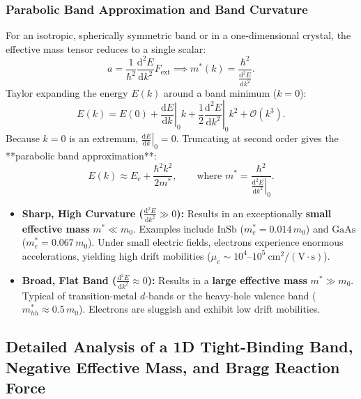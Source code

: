 \documentclass[11pt,a4paper]{article}
\newcommand{\dv}[2]{\frac{\mathrm{d}#1}{\mathrm{d}#2}}
\newcommand{\dvtwo}[2]{\frac{\mathrm{d}^2#1}{\mathrm{d}#2^2}}
\newcommand{\hb}{\hbar}
\newcommand{\hbarsq}{\hb^2}
\begin{document}
\subsubsection{Parabolic Band Approximation and Band Curvature}
For an isotropic, spherically symmetric band or in a one-dimensional crystal, the effective mass tensor reduces to a single scalar:
\begin{equation}
    a = \frac{1}{\hbarsq}\dvtwo{E}{k} F_{\mathrm{ext}} \implies \boxed{m^*(k) = \frac{\hbarsq}{\dvtwo{E}{k}}.}
    \label{eq:mstar_scalar_master}
\end{equation}
Taylor expanding the energy $E(k)$ around a band minimum ($k=0$):
\begin{equation}
    E(k) = E(0) + \left.\dv{E}{k}\right|_0 k + \frac{1}{2}\left.\dvtwo{E}{k}\right|_0 k^2 + \mathcal{O}(k^3).
\end{equation}
Because $k=0$ is an extremum, $\left.\dv{E}{k}\right|_0 = 0$. Truncating at second order gives the **parabolic band approximation**:
\begin{equation}
    E(k) \approx E_c + \frac{\hbarsq k^2}{2m^*}, \qquad \text{where } m^* = \frac{\hbarsq}{\left.\dvtwo{E}{k}\right|_0}.
\end{equation}
\begin{itemize}
    \item \textbf{Sharp, High Curvature ($\dvtwo{E}{k} \gg 0$):} Results in an exceptionally \textbf{small effective mass} $m^* \ll m_0$. Examples include $\text{InSb}$ ($m_e^* = 0.014\,m_0$) and $\text{GaAs}$ ($m_e^* = 0.067\,m_0$). Under small electric fields, electrons experience enormous accelerations, yielding high drift mobilities ($\mu_e \sim 10^4\text{--}10^5\ \mathrm{cm^2/(V\cdot s)}$).
    \item \textbf{Broad, Flat Band ($\dvtwo{E}{k} \approx 0$):} Results in a \textbf{large effective mass} $m^* \gg m_0$. Typical of transition-metal $d$-bands or the heavy-hole valence band ($m_{hh}^* \approx 0.5\,m_0$). Electrons are sluggish and exhibit low drift mobilities.
\end{itemize}

\subsection{Detailed Analysis of a 1D Tight-Binding Band, Negative Effective Mass, and Bragg Reaction Force}
\end{document}

